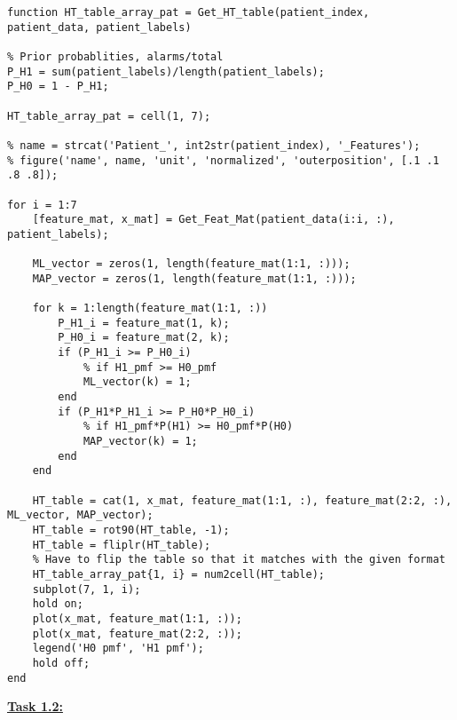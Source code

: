 \documentclass{article}
\begin{document}
\begin{lstlisting}
function HT_table_array_pat = Get_HT_table(patient_index, patient_data, patient_labels)

% Prior probablities, alarms/total
P_H1 = sum(patient_labels)/length(patient_labels);
P_H0 = 1 - P_H1;

HT_table_array_pat = cell(1, 7);

% name = strcat('Patient_', int2str(patient_index), '_Features');
% figure('name', name, 'unit', 'normalized', 'outerposition', [.1 .1 .8 .8]);

for i = 1:7
	[feature_mat, x_mat] = Get_Feat_Mat(patient_data(i:i, :), patient_labels);
	
	ML_vector = zeros(1, length(feature_mat(1:1, :)));
	MAP_vector = zeros(1, length(feature_mat(1:1, :)));
	
	for k = 1:length(feature_mat(1:1, :))
		P_H1_i = feature_mat(1, k);
		P_H0_i = feature_mat(2, k);
		if (P_H1_i >= P_H0_i)
			% if H1_pmf >= H0_pmf
			ML_vector(k) = 1;
		end
		if (P_H1*P_H1_i >= P_H0*P_H0_i)
			% if H1_pmf*P(H1) >= H0_pmf*P(H0)
			MAP_vector(k) = 1;
		end
	end
	
	HT_table = cat(1, x_mat, feature_mat(1:1, :), feature_mat(2:2, :), ML_vector, MAP_vector);
	HT_table = rot90(HT_table, -1);
	HT_table = fliplr(HT_table);
	% Have to flip the table so that it matches with the given format
	HT_table_array_pat{1, i} = num2cell(HT_table);
	subplot(7, 1, i);
 	hold on;
 	plot(x_mat, feature_mat(1:1, :));
 	plot(x_mat, feature_mat(2:2, :));
 	legend('H0 pmf', 'H1 pmf');
 	hold off;
end
\end{lstlisting}
\underline{\textbf{Task 1.2:}}
\end{document}
